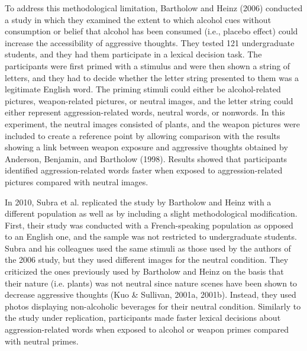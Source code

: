 \documentclass[authordate, serif, review]{jote-article}
\begin{document}
\begin{multicols}{2}
To address this methodological limitation, Bartholow and Heinz (2006) conducted a study in which they examined the extent to which alcohol cues without consumption or belief that alcohol has been consumed (i.e., placebo effect) could increase the accessibility of aggressive thoughts. They tested 121 undergraduate students, and they had them participate in a lexical decision task. The participants were first primed with a stimulus and were then shown a string of letters, and they had to decide whether the letter string presented to them was a legitimate English word. The priming stimuli could either be alcohol-related pictures, weapon-related pictures, or neutral images, and the letter string could either represent aggression-related words, neutral words, or nonwords. In this experiment, the neutral images consisted of plants, and the weapon pictures were included to create a reference point by allowing comparison with the results showing a link between weapon exposure and aggressive thoughts obtained by Anderson, Benjamin, and Bartholow (1998). Results showed that participants identified aggression-related words faster when exposed to aggression-related pictures compared with neutral images. 

In 2010, Subra et al. replicated the study by Bartholow and Heinz with a different population as well as by including a slight methodological modification. First, their study was conducted with a French-speaking population as opposed to an English one, and the sample was not restricted to undergraduate students. Subra and his colleagues used the same stimuli as those used by the authors of the 2006 study, but they used different images for the neutral condition. They criticized the ones previously used by Bartholow and Heinz on the basis that their nature (i.e. plants) was not neutral since nature scenes have been shown to decrease aggressive thoughts (Kuo \& Sullivan, 2001a, 2001b). Instead, they used photos displaying non-alcoholic beverages for their neutral condition. Similarly to the study under replication, participants made faster lexical decisions about aggression-related words when exposed to alcohol or weapon primes compared with neutral primes.  


\end{multicols}
\end{document}
